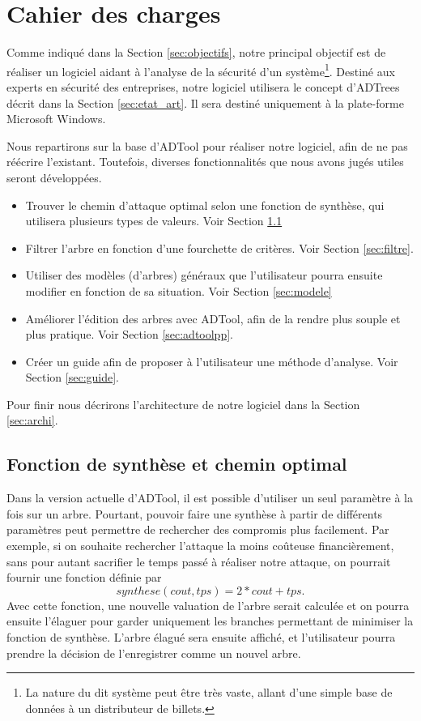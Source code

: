 \section{Cahier des charges}
    \label{sec:cahier}

    Comme indiqué dans la Section \ref{sec:objectifs}, notre principal objectif est de réaliser un logiciel aidant à l'analyse de la sécurité d'un système\footnote{La nature du dit système peut être très vaste, allant d'une simple base de données à un distributeur de billets.}. Destiné aux experts en sécurité des entreprises, notre logiciel utilisera le concept d'ADTrees décrit dans la Section \ref{sec:etat_art}. Il sera destiné uniquement à la plate-forme Microsoft Windows.

    Nous repartirons sur la base d'ADTool pour réaliser notre logiciel, afin de ne pas réécrire l'existant. Toutefois, diverses fonctionnalités que nous avons jugés utiles seront développées.
    \begin{itemize}
        \item Trouver le chemin d'attaque optimal selon une fonction de synthèse, qui utilisera plusieurs types de valeurs. Voir Section \ref{sec:fct_synth}
        \item Filtrer l'arbre en fonction d'une fourchette de critères. Voir Section \ref{sec:filtre}.
        \item Utiliser des modèles (d'arbres) généraux que l'utilisateur pourra ensuite modifier en fonction de sa situation. Voir Section \ref{sec:modele}
        \item Améliorer l'édition des arbres avec ADTool, afin de la rendre plus souple et plus pratique. Voir Section \ref{sec:adtoolpp}.
        \item Créer un guide afin de proposer à l'utilisateur une méthode d'analyse. Voir Section \ref{sec:guide}.
    \end{itemize}

    Pour finir nous décrirons l'architecture de notre logiciel dans la Section \ref{sec:archi}.

    \subsection{Fonction de synthèse et chemin optimal}
        \label{sec:fct_synth}

        Dans la version actuelle d'ADTool, il est possible d'utiliser un seul paramètre à la fois sur un arbre. Pourtant, pouvoir faire une synthèse à partir de différents paramètres peut permettre de rechercher des compromis plus facilement.
        Par exemple, si on souhaite rechercher l'attaque la moins coûteuse financièrement, sans pour autant sacrifier le temps passé à réaliser notre attaque, on pourrait fournir une fonction définie par \[ synthese(cout, tps) = 2*cout + tps . \]
        Avec cette fonction, une nouvelle valuation de l'arbre serait calculée et on pourra ensuite l'élaguer pour garder uniquement les branches permettant de minimiser la fonction de synthèse.
        L'arbre élagué sera ensuite affiché, et l'utilisateur pourra prendre la décision de l'enregistrer comme un nouvel arbre.

